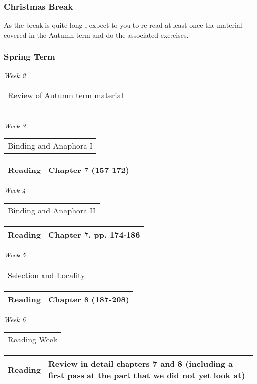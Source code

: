 \documentclass[12pt]{article}
\begin{document}


\subsubsection*{Christmas Break}  As the break is quite long I expect to you to re-read at least once the material covered in the Autumn term and do the associated exercises.


\subsubsection*{Spring Term}
\textit{Week 2} \dotfill \begin{tabular}[t]{l} Review of Autumn term material\\ \end{tabular} \\
\textit{Week 3} \dotfill \begin{tabular}[t]{l} Binding and Anaphora I \end{tabular}
\begin{flushright}
\begin{tabular}[t]{|l|p{2in}|}\hline \textbf{Reading} & Chapter 7 (157-172) \\\hline \end{tabular}
\end{flushright}
\textit{Week 4} \dotfill \begin{tabular}[t]{l} Binding and Anaphora II \end{tabular}
\begin{flushright}
\begin{tabular}[t]{|l|p{2in}|}\hline \textbf{Reading} & Chapter 7.  pp. 174-186 \\\hline \end{tabular}
\end{flushright}
\textit{Week 5} \dotfill \begin{tabular}[t]{l} Selection and Locality \end{tabular}
\begin{flushright}
\begin{tabular}[t]{|l|p{2in}|}\hline \textbf{Reading} & Chapter 8 (187-208) \\\hline \end{tabular}
\end{flushright}
\textit{Week 6} \dotfill \begin{tabular}[t]{l} Reading Week \end{tabular}
\begin{flushright}
\begin{tabular}[t]{|l|p{2in}|}\hline \textbf{Reading} & Review in detail chapters 7 and 8 (including a first pass at the part that we did not yet look at) \\\hline \end{tabular}
\end{flushright}
\end{document}

